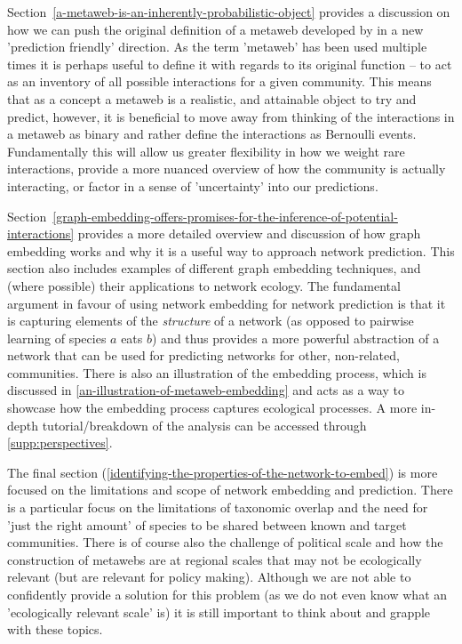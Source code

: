 \begin{refsection}
Section~\ref{a-metaweb-is-an-inherently-probabilistic-object} provides a discussion on how we can push the original definition of a metaweb developed by \cite{Dunne2006Network} in a new 'prediction friendly' direction. As the term 'metaweb' has been used multiple times it is perhaps useful to define it with regards to its original function -- to act as an inventory of all possible interactions for a given community. This means that as a concept a metaweb is a realistic, and attainable object to try and predict, however, it is beneficial to move away from thinking of the interactions in a metaweb as binary and rather define the interactions as Bernoulli events. Fundamentally this will allow us greater flexibility in how we weight rare interactions, provide a more nuanced overview of how the community is actually interacting, or factor in a sense of 'uncertainty' into our predictions.

Section~\ref{graph-embedding-offers-promises-for-the-inference-of-potential-interactions} provides a more detailed overview and discussion of how graph embedding works and why it is a useful way to approach network prediction. This section also includes examples of different graph embedding techniques, and (where possible) their applications to network ecology. The fundamental argument in favour of using network embedding for network prediction is that it is capturing elements of the \emph{structure} of a network (as opposed to pairwise learning of species $a$ eats $b$) and thus provides a more powerful abstraction of a network that can be used for predicting networks for other, non-related, communities. There is also an illustration of the embedding process, which is discussed in \autoref{an-illustration-of-metaweb-embedding} and acts as a way to showcase how the embedding process captures ecological processes. A more in-depth tutorial/breakdown of the analysis can be accessed through \autoref{supp:perspectives}.

The final section (\autoref{identifying-the-properties-of-the-network-to-embed}) is more focused on the limitations and scope of network embedding and prediction. There is a particular focus on the limitations of taxonomic overlap and the need for 'just the right amount' of species to be shared between known and target communities. There is of course also the challenge of political scale and how the construction of metawebs are at regional scales that may not be ecologically relevant (but are relevant for policy making). Although we are not able to confidently provide a solution for this problem (as we do not even know what an 'ecologically relevant scale' is) it is still important to think about and grapple with these topics.


\end{refsection}

